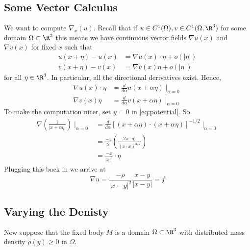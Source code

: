 \documentclass{bkcnotes}
\begin{document}
\subsection{Some Vector Calculus}
We want to compute $\nabla_x(u)$. Recall that if $u \in C^1(\Omega), v
\in C^1(\Omega, \R^3)$ for some domain $\Omega \subset \R^3$ this means
we have continuous vector fields $\nabla u(x)$ and $\nabla v(x)$ for
fixed $x$ such that
\begin{equation}
  \label{eq:grad-def}
  \begin{aligned}
    u(x+\eta) - u(x) &= \nabla u(x)\cdot \eta + o(|\eta |) \\
    v(x+\eta) - v(x) &= \nabla v(x) \eta + o(|\eta |)
  \end{aligned}
\end{equation}
for all $\eta \in \R^3$. In particular, all the directional
derivatives exist. Hence,
\begin{equation}
  \label{eq:directional-ders}
  \begin{aligned}
    \nabla u(x)\cdot \eta &= \frac{d}{d\alpha} u(x+\alpha \eta) \mid_{\alpha=0} \\
    \nabla v(x)\eta &= \frac{d}{d\alpha} v(x+\alpha \eta) \mid_{\alpha=0}
  \end{aligned}
\end{equation}
To make the computation nicer, set $y = 0$ in
\eqref{eq:potential}. So
\begin{equation}
  \label{eq:potential-gradient}
  \begin{aligned}
    \nabla\left(\frac{1}{|x+\alpha\eta |}\right)\mid_{\alpha=0} &=
    \frac{d}{d\alpha}\left[(x+\alpha\eta)\cdot (x+\alpha\eta)\right]^{-1/2} \mid_{\alpha =0} \\
    &= \frac{-1}{2}\left(\frac{2x\cdot \eta)}{(x\cdot x)^{3/2}}\right) \\
    &= \frac{-x}{|x|^3}\cdot \eta    
  \end{aligned}
\end{equation}
Plugging this back in we arrive at
\begin{equation}
  \label{eq:grad-u}
  \nabla u = \frac{-\rho}{|x-y|^2}\frac{x-y}{|x-y|} = f
\end{equation}

\subsection{Varying the Denisty}
Now suppose that the fixed body $M$ is a domain $\Omega \subset \R^3$
with distributed mass density $\rho(y) \geq 0$ in $\Omega$.
\end{document}
